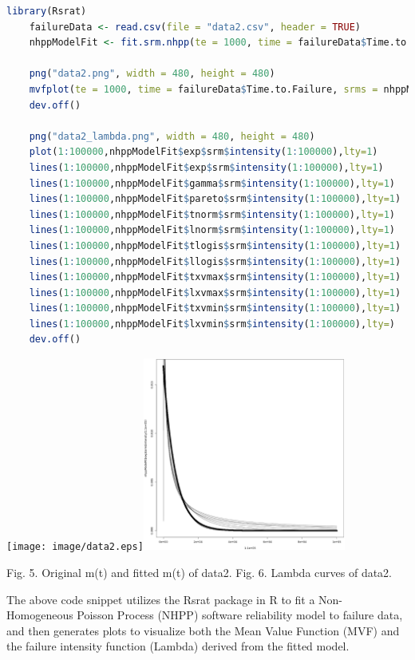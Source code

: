 \documentclass[12pt]{article}
\numberwithin{table}{section}
\begin{document}
\begin{lstlisting}[language=R]
	library(Rsrat)
	failureData <- read.csv(file = "data2.csv", header = TRUE)
	nhppModelFit <- fit.srm.nhpp(te = 1000, time = failureData$Time.to.Failure, selection = NULL)
	
	png("data2.png", width = 480, height = 480)
	mvfplot(te = 1000, time = failureData$Time.to.Failure, srms = nhppModelFit)
	dev.off()
	
	png("data2_lambda.png", width = 480, height = 480)
	plot(1:100000,nhppModelFit$exp$srm$intensity(1:100000),lty=1)
	lines(1:100000,nhppModelFit$exp$srm$intensity(1:100000),lty=1)
	lines(1:100000,nhppModelFit$gamma$srm$intensity(1:100000),lty=1)
	lines(1:100000,nhppModelFit$pareto$srm$intensity(1:100000),lty=1)
	lines(1:100000,nhppModelFit$tnorm$srm$intensity(1:100000),lty=1)
	lines(1:100000,nhppModelFit$lnorm$srm$intensity(1:100000),lty=1)
	lines(1:100000,nhppModelFit$tlogis$srm$intensity(1:100000),lty=1)
	lines(1:100000,nhppModelFit$llogis$srm$intensity(1:100000),lty=1)
	lines(1:100000,nhppModelFit$txvmax$srm$intensity(1:100000),lty=1)
	lines(1:100000,nhppModelFit$lxvmax$srm$intensity(1:100000),lty=1)
	lines(1:100000,nhppModelFit$txvmin$srm$intensity(1:100000),lty=1)
	lines(1:100000,nhppModelFit$lxvmin$srm$intensity(1:100000),lty=)
	dev.off()\end{lstlisting} 

\begin{center}
	\texttt{[image: image/data2.eps]}\includegraphics[width=0.5\textwidth]{image/data2_lambda.eps}
	
	{\small Fig. 5. Original m(t) and fitted m(t) of data2.}
	{\small Fig. 6. Lambda curves of data2.}
\end{center}


The above code snippet utilizes the Rsrat package in R to fit a Non-Homogeneous Poisson Process (NHPP) software reliability model to failure data, and then generates plots to visualize both the Mean Value Function (MVF) and the failure intensity function (Lambda) derived from the fitted model.
\end{document}
